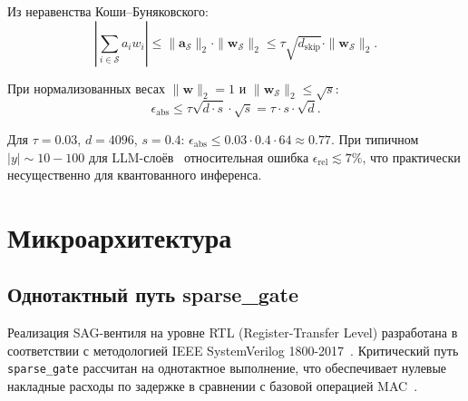 Из неравенства Коши–Буняковского:
\begin{equation}
  \left|\sum_{i \in \mathcal{S}} a_i w_i\right|
  \leq \|\mathbf{a}_{\mathcal{S}}\|_2 \cdot \|\mathbf{w}_{\mathcal{S}}\|_2
  \leq \tau \sqrt{d_{\text{skip}}} \cdot \|\mathbf{w}_{\mathcal{S}}\|_2.
  \label{eq:cauchy-schwarz}
\end{equation}

При нормализованных весах $\|\mathbf{w}\|_2 = 1$ и
$\|\mathbf{w}_{\mathcal{S}}\|_2 \leq \sqrt{s}$:
\begin{equation}
  \epsilon_{\mathrm{abs}} \leq \tau \sqrt{d \cdot s} \cdot \sqrt{s}
  = \tau \cdot s \cdot \sqrt{d}.
  \label{eq:abs-error-bound}
\end{equation}

Для $\tau = 0{.}03$, $d = 4096$, $s = 0{.}4$:
$\epsilon_{\mathrm{abs}} \leq 0{.}03 \cdot 0{.}4 \cdot 64 \approx 0{.}77$.
При типичном $|y| \sim 10{-}100$ для LLM-слоёв~\cite{frankle2018lottery}
относительная ошибка $\epsilon_{\mathrm{rel}} \lesssim 7\%$,
что практически несущественно для квантованного инференса.

\section{Микроархитектура}
\label{sec:glava87-microarch}

\subsection{Однотактный путь sparse\_gate}
\label{ssec:glava87-single-cycle}

Реализация SAG-вентиля на уровне RTL (Register-Transfer Level)
разработана в соответствии с методологией IEEE SystemVerilog
1800-2017~\cite{IEEE-SV-1800-2017}.  Критический путь
\texttt{sparse\_gate} рассчитан на однотактное выполнение,
что обеспечивает нулевые накладные расходы по задержке
в сравнении с базовой операцией MAC~\cite{Hennessy-Patterson-CA6}.

